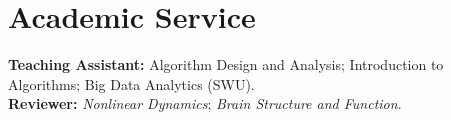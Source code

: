 \documentclass[a4paper,10pt]{article}
\begin{document}
\section{Academic Service}

{\small
\textbf{Teaching Assistant:} Algorithm Design and Analysis; Introduction to Algorithms; Big Data Analytics (SWU).\\
\textbf{Reviewer:} \textit{Nonlinear Dynamics}; \textit{Brain Structure and Function}.\par
}


\end{document}
